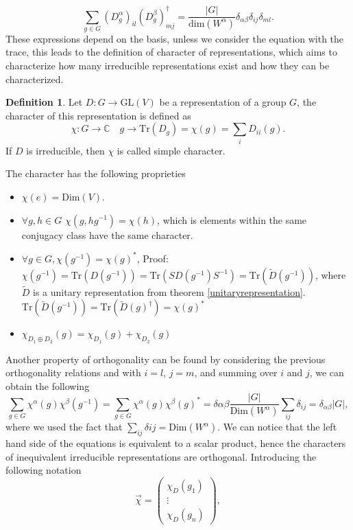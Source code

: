 \documentclass[12pt]{book}
\theoremstyle{plain}
\newcommand{\C}{\mathbb{C}}
\theoremstyle{definition}
\newtheorem{dfn}[thm]{Definition}
\theoremstyle{remark}
\begin{document}
\[\sum_{g\in G}\left(D_g^\alpha\right)_{il}\left(D_{g}^\beta\right)_{mj}^\dagger = \frac{|G|}{\text{dim}(W^{\alpha})} \delta_{\alpha\beta}\delta_{ij}\delta_{ml}.\]
These expressions depend on the basis, unless we consider the equation with the trace, this leads to the definition of character of representations, which aims to characterize how many irreducible representations exist and how they can be characterized.
\begin{dfn}
Let $D:G\to \text{GL}(V)$ be a representation of a group $G$, the character of this representation is defined as
\[\chi:G \to \C \quad g\to \text{Tr}(D_g) = \chi(g) = \sum_i D_{ii}(g).\]
If $D$ is irreducible, then $\chi$ is called simple character.
\end{dfn}
The character has the following proprieties
\begin{itemize}
\item $\chi(e) = \text{Dim}(V)$.
\item $\forall g,h\in G$ $\chi(g,hg^{-1}) = \chi(h)$, which is elements within the same conjugacy class have the same character.
\item $\forall g\in G, \chi(g^{-1}) = \chi(g)^*$, Proof: $\chi(g^{-1}) = \text{Tr}(D(g^{-1})) = \text{Tr}(SD(g^{-1})S^{-1}) = \text{Tr}(\widetilde{D}(g^{-1}))$, where $\widetilde{D}$ is a unitary representation from theorem \ref{unitaryrepresentation}. $\text{Tr}(\widetilde{D}(g^{-1})) = \text{Tr}(\widetilde{D}(g)^\dagger) = \chi(g)^*$
\item $\chi_{D_1 \oplus D_2}(g) = \chi_{D_1}(g) + \chi_{D_2}(g)$
\end{itemize}
Another property of orthogonality can be found by considering the previous orthogonality relations and with $i=l$, $j=m$, and summing over $i$ and $j$, we can obtain the following
\begin{equation}\label{nonsonooriginale}\sum_{g\in G}\chi^\alpha (g) \chi^\beta(g^{-1}) = \sum_{g\in G} \chi^\alpha (g) \chi^\beta(g)^* = \delta{\alpha\beta}\frac{|G|}{\text{Dim}(W^\alpha)}\sum_{ij}\delta_{ij} = \delta_{\alpha\beta}|G|,\end{equation}
where we used the fact that $\sum_{ij}\delta{ij} = \text{Dim}(W^\alpha)$. We can notice that the left hand side of the equations is equivalent to a scalar product, hence the characters of inequivalent irreducible representations are orthogonal. Introducing the following notation
\[\overrightarrow{\chi}  = \begin{pmatrix}\chi_D(g_1)\\ \vdots \\ \chi_D(g_n)\end{pmatrix},\]
\end{document}
